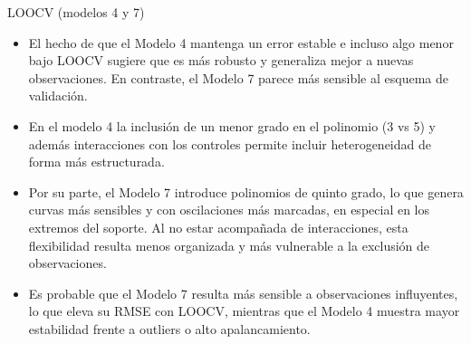 \documentclass[11pt]{beamer}
\begin{document}
\begin{frame}{LOOCV (modelos 4 y 7)}
\small
\begin{itemize}
    \item El hecho de que el Modelo 4 mantenga un error estable e incluso algo menor bajo LOOCV sugiere que es más robusto y generaliza mejor a nuevas observaciones. En contraste, el Modelo 7 parece más sensible al esquema de validación.
    \item En el modelo 4 la inclusión de un menor grado en el polinomio (3 vs 5) y además interacciones con los controles permite incluir heterogeneidad de forma más estructurada.
    \item Por su parte, el Modelo 7 introduce polinomios de quinto grado, lo que genera curvas más sensibles y con oscilaciones más marcadas, en especial en los extremos del soporte. Al no estar acompañada de interacciones, esta flexibilidad resulta menos organizada y más vulnerable a la exclusión de observaciones. 
    \item Es probable que el Modelo 7 resulta más sensible a observaciones influyentes, lo que eleva su RMSE con LOOCV, mientras que el Modelo 4 muestra mayor estabilidad frente a outliers o alto apalancamiento.
\end{itemize}
    
\end{frame}
\end{document}
